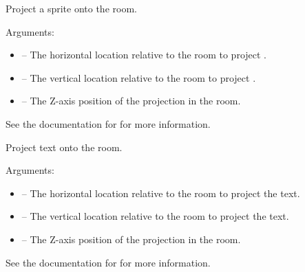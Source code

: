 \documentclass[letterpaper,10pt,english]{sphinxmanual}
\begin{document}

\begin{fulllineitems}
\label{dsp:sge.dsp.Room.project_sprite}
Project a sprite onto the room.

Arguments:
\begin{itemize}
\item {} 
 -- The horizontal location relative to the room to
project .

\item {} 
 -- The vertical location relative to the room to project
.

\item {} 
 -- The Z-axis position of the projection in the room.

\end{itemize}

See the documentation for {\hyperref[gfx:sge.gfx.Sprite.draw_sprite]{\emph{}}} for
more information.

\end{fulllineitems}


\begin{fulllineitems}
\label{dsp:sge.dsp.Room.project_text}
Project text onto the room.

Arguments:
\begin{itemize}
\item {} 
 -- The horizontal location relative to the room to
project the text.

\item {} 
 -- The vertical location relative to the room to project
the text.

\item {} 
 -- The Z-axis position of the projection in the room.

\end{itemize}

See the documentation for {\hyperref[gfx:sge.gfx.Sprite.draw_text]{\emph{}}} for
more information.

\end{fulllineitems}
\end{document}
